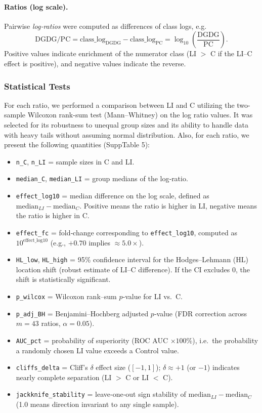 \documentclass[10pt,letterpaper]{article}
\begin{document}
\begin{itemize}
\paragraph{Ratios (log scale).}
Pairwise \emph{log‐ratios} were computed as differences of class logs, e.g.
\[
\text{DGDG/PC} = \text{class\_log}_{\text{DGDG}} - \text{class\_log}_{\text{PC}} 
= \log_{10}\!\left(\frac{\text{DGDG}}{\text{PC}}\right).
\]
Positive values indicate enrichment of the numerator class (LI $>$ C if the LI–C effect is positive), and negative values indicate the reverse.

\subsubsection*{Statistical Tests}
For each ratio, we performed a comparison between LI and C utilizing the two-sample Wilcoxon rank-sum test (Mann–Whitney) on the log ratio values. It was selected for its robustness to unequal group sizes and its ability to handle data with heavy tails without assuming normal distribution. Also, for each ratio, we present the following quantities (SuppTable 5):

\begin{itemize}
\item \texttt{n\_C}, \texttt{n\_LI} = sample sizes in C and LI.
\item \texttt{median\_C}, \texttt{median\_LI} =  group medians of the log‐ratio.
\item \texttt{effect\_log10} = median difference on the log scale, defined as $\text{median}_{LI} - \text{median}_{C}$. Positive means the ratio is higher in LI, negative means the ratio is higher in C. 
\item \texttt{effect\_fc} = fold‐change corresponding to \texttt{effect\_log10}, computed as $10^{\text{effect\_log10}}$ (e.g., $+0.70$ implies $\approx 5.0\times$).
\item \texttt{HL\_low}, \texttt{HL\_high} = 95\% confidence interval for the Hodges–Lehmann (HL) location shift (robust estimate of LI–C difference). If the CI excludes 0, the shift is statistically significant.
\item \texttt{p\_wilcox} = Wilcoxon rank–sum $p$‐value for LI vs.\ C.
\item \texttt{p\_adj\_BH} = Benjamini–Hochberg adjusted $p$‐value (FDR correction across $m=43$ ratios, $\alpha=0.05$).
\item \texttt{AUC\_pct} = probability of superiority (ROC AUC $\times 100\%$), i.e.\ the probability a randomly chosen LI value exceeds a Control value.
\item \texttt{cliffs\_delta} = Cliff’s $\delta$ effect size ($[-1,1]$); $\delta \approx +1$ (or $-1$) indicates nearly complete separation (LI $>$ C or LI $<$ C). 
\item \texttt{jackknife\_stability} = leave‐one‐out sign stability of $\text{median}_{LI} - \text{median}_{C}$ (1.0 means direction invariant to any single sample).
\end{itemize}




\end{itemize}
\end{document}
